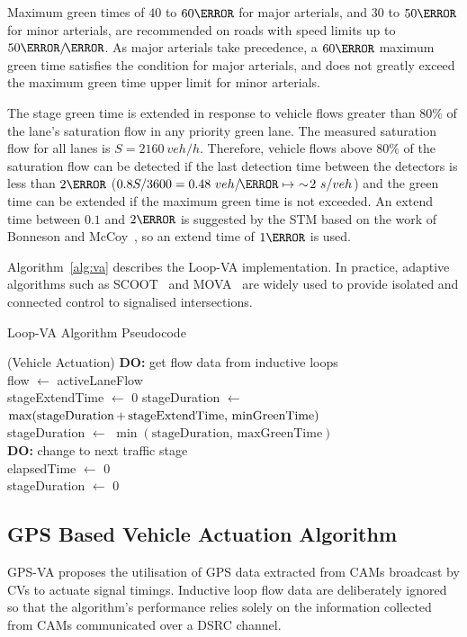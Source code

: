 \documentclass[numbered]{trbunofficial}
\newcommand{\sidiv}{/\hspace{-1.5pt}} %
\begin{document}
Maximum green times of $40$ to $60\s$ for major arterials, and $30$ to $50\s$ for minor arterials, are recommended on roads with speed limits up to $50\km\sidiv\hour$. As major arterials take precedence, a $60\s$ maximum green time satisfies the condition for major arterials, and does not greatly exceed the maximum green time upper limit for minor arterials.

The stage green time is extended in response to vehicle flows greater than $80\%$ of the lane's saturation flow in any priority green lane. The measured saturation flow for all lanes is $S=2160\ veh/h$. Therefore, vehicle flows above $80\%$ of the saturation flow can be detected if the last detection time between the detectors is less than $2\s$ ($0.8S/3600 = 0.48\ veh\sidiv\s \mapsto\ \sim\!2\ s/veh$) and the green time can be extended if the maximum green time is not exceeded. An extend time between $0.1$ and $2\s$ is suggested by the STM based on the work of Bonneson and McCoy~\cite{bonneson2005}, so an extend time of $1\s$ is used.

Algorithm~\ref{alg:va} describes the Loop-VA implementation. In practice, adaptive algorithms such as SCOOT~\cite{hunt1981} and MOVA~\cite{vincent88} are widely used to provide isolated and connected control to signalised intersections.

\begin{algorithm}[h]
	\caption{Loop-VA Algorithm Pseudocode}
	\label{alg:va}
	\SetAlgoVlined
	\SetVlineSkip{3pt}
	\Begin(Vehicle Actuation){
		\textbf{DO:} get flow data from inductive loops\\
		flow $\gets$ activeLaneFlow \\
		{
			stageExtendTime $\gets$ 0
		}
		stageDuration $\gets$ $\max(\text{stageDuration\,+\,\text{stageExtendTime}},\,\text{minGreenTime})$ \\
		stageDuration $\gets$ $\min(\text{stageDuration},\,\text{maxGreenTime})$\\
		{ 
			\textbf{DO:} change to next traffic stage\\
			elapsedTime $\gets$ 0\\
			stageDuration $\gets$ 0
		}
	}
\end{algorithm}

\subsection{GPS Based Vehicle Actuation Algorithm}\label{sec:gpsva}
GPS-VA proposes the utilisation of GPS data extracted from CAMs broadcast by CVs to actuate signal timings. Inductive loop flow data are deliberately ignored so that the algorithm's performance relies solely on the information collected from CAMs communicated over a DSRC channel. 
\end{document}
